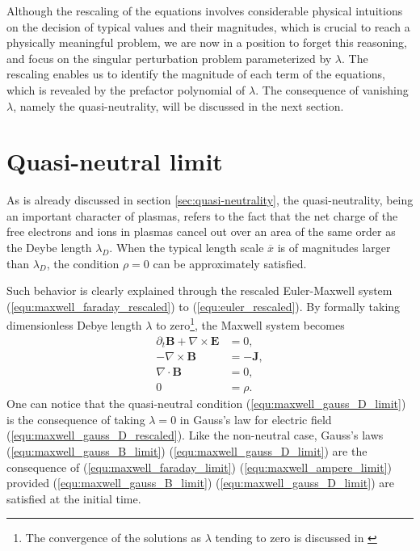 \documentclass{report}
\begin{document}
Although the rescaling of the equations involves considerable physical intuitions on the decision of typical values and their magnitudes, which is crucial to reach a physically meaningful problem, we are now in a position to forget this reasoning, and focus on the singular perturbation problem parameterized by $\lambda$. The rescaling enables us to identify the magnitude of each term of the equations, which is revealed by the prefactor polynomial of $\lambda$. The consequence of vanishing $\lambda$, namely the quasi-neutrality, will be discussed in the next section.

\section{Quasi-neutral limit} \label{sec:quasi-neutral_limit}
As is already discussed in section \ref{sec:quasi-neutrality}, the quasi-neutrality, being an important character of plasmas, refers to the fact that the net charge of the free electrons and ions in plasmas cancel out over an area of the same order as the Deybe length $\lambda_D$. When the typical length scale $\overline{x}$ is of magnitudes larger than $\lambda_D$, the condition $\rho = 0$ can be approximately satisfied.

Such behavior is clearly explained through the rescaled Euler-Maxwell system (\ref{equ:maxwell_faraday_rescaled}) to (\ref{equ:euler_rescaled}). By formally taking dimensionless Debye length $\lambda$ to zero\footnote{The convergence of the solutions as $\lambda$ tending to zero is discussed in \cite[][chap. 2]{remi_2014}}, the Maxwell system becomes 
\begin{align}
    \partial_t \mathbf{B} + \nabla \times \mathbf{E} &= 0, \label{equ:maxwell_faraday_limit} \\ 
    - \nabla \times \mathbf{B} &= - \mathbf{J}, \label{equ:maxwell_ampere_limit} \\
    \nabla \cdot \mathbf{B} &= 0,  \label{equ:maxwell_gauss_B_limit}\\
     0 &= \rho. \label{equ:maxwell_gauss_D_limit}
\end{align}
One can notice that the quasi-neutral condition (\ref{equ:maxwell_gauss_D_limit}) is the consequence of taking $\lambda = 0$ in Gauss's law for electric field (\ref{equ:maxwell_gauss_D_rescaled}). Like the non-neutral case, Gauss's laws (\ref{equ:maxwell_gauss_B_limit}) (\ref{equ:maxwell_gauss_D_limit}) are the consequence of (\ref{equ:maxwell_faraday_limit}) (\ref{equ:maxwell_ampere_limit}) provided (\ref{equ:maxwell_gauss_B_limit}) (\ref{equ:maxwell_gauss_D_limit}) are satisfied at the initial time.  
\end{document}
